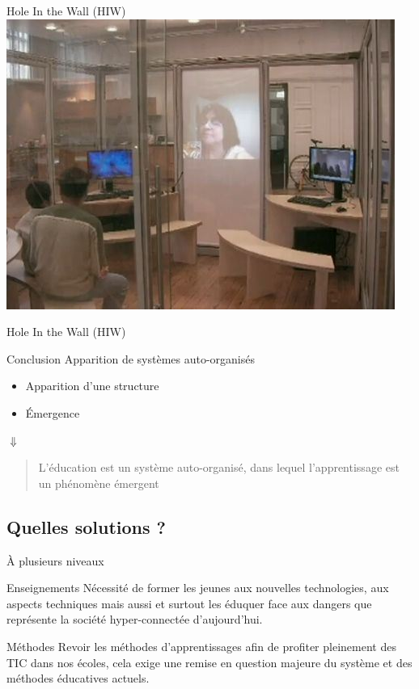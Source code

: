 \begin{frame}{Hole In the Wall (HIW)}
\includegraphics[width=.9\textwidth]{../resources/illustrations/soles.jpg}
\end{frame}

\begin{frame}{Hole In the Wall (HIW)}
  \begin{block}{Conclusion}
    Apparition de systèmes auto-organisés
    \begin{itemize}
      \item Apparition d'une structure
      \item Émergence
    \end{itemize}
    \pause
    \begin{center}
      $\Downarrow$
      
     \begin{quote}
      L'éducation est un système auto-organisé, dans lequel l'apprentissage est un phénomène émergent
    \end{quote}
    \end{center}
  \end{block}
\end{frame}

\subsection{Quelles solutions ?}

\begin{frame}{À plusieurs niveaux}
\begin{block}{Enseignements}
Nécessité de former les jeunes aux nouvelles technologies, aux aspects techniques mais aussi et surtout les éduquer face aux dangers que représente la société hyper-connectée d'aujourd'hui.
\end{block}
\begin{block}{Méthodes}
Revoir les méthodes d'apprentissages afin de profiter pleinement des TIC dans nos écoles, cela exige une remise en question majeure du système et des méthodes éducatives actuels.
\end{block}
\end{frame}

